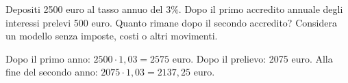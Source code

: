 
\begin{esercizio}
Depositi 2500 euro al tasso annuo del $3\%$. Dopo il primo accredito annuale degli interessi prelevi 500 euro. Quanto rimane dopo il secondo accredito? Considera un modello senza imposte, costi o altri movimenti.
\end{esercizio}

\begin{soluzione}
Dopo il primo anno: $2500\cdot1{,}03=2575$ euro. Dopo il prelievo: 2075 euro. Alla fine del secondo anno: $2075\cdot1{,}03=2137{,}25$ euro.
\end{soluzione}
